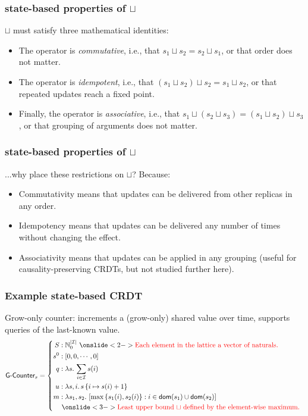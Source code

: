 \documentclass[aspectratio=169,compress,handout]{beamer}
\newcommand*{\CRDT}{\textsf{CRDT}\xspace}
\newcommand*{\CRDTs}{\textsf{CRDTs}\xspace}
\begin{document}
  \begin{frame}
    \frametitle{state-based properties of $\sqcup$}

    $\sqcup$ must satisfy three mathematical identities:
    \begin{itemize}
      \item<2-> The operator is \emph{commutative}, i.e., that $s_1 \sqcup s_2 = s_2
        \sqcup s_1$, or that order does not matter.
      \item<3-> The operator is \emph{idempotent}, i.e., that $(s_1 \sqcup s_2)
        \sqcup s_2 = s_1 \sqcup s_2$, or that repeated updates reach a fixed point.
      \item<4-> Finally, the operator is \emph{associative}, i.e., that $s_1 \sqcup (s_2
        \sqcup s_3) = (s_1 \sqcup s_2) \sqcup s_3$, or that grouping of arguments
        does not matter.
    \end{itemize}
  \end{frame}

  \begin{frame}
    \frametitle{state-based properties of $\sqcup$}
    ...why place these restrictions on $\sqcup$? Because:
    \begin{itemize}[<+->]
      \item<2-> Commutativity means that updates can be delivered from other
        replicas in any order.
      \item<3-> Idempotency means that updates can be delivered any number of times
        without changing the effect.
      \item<4-> Associativity means that updates can be applied in any grouping
        (useful for causality-preserving \CRDTs, but not studied further here).
    \end{itemize}
  \end{frame}

  \begin{frame}
    \frametitle{Example state-based \CRDT}

    Grow-only counter: increments a (grow-only) shared value over time, supports
    queries of the last-known value.
    \[
      \textsf{G-Counter}_s = \left\{\begin{aligned}
        S &: \mathbb{N}_0^{|\mathcal{I}|}~\onslide<2->{\text{%
          \color{red}
          Each element in the lattice a vector of naturals.
        }} \\
        s^0 &: \left[ 0, 0, \cdots, 0 \right] \\
        q &: \lambda s.\, \sum_{i \in \mathcal{I}} s(i) \\
        u &: \lambda s,i.\, s\left\{ i \mapsto s(i) + 1 \right\} \\
        m &: \lambda s_1, s_2.\, \left[ \max\left\{ s_1(i), s_2(i) \right\}: i \in \mathsf{dom}(s_1) \cup
        \mathsf{dom}(s_2) \right] \\
          &~\onslide<3->{\text{%
            \color{red}
            Least upper bound $\sqcup$ defined by the element-wise maximum.
          }}
      \end{aligned}\right.
    \]
  \end{frame}
\end{document}
